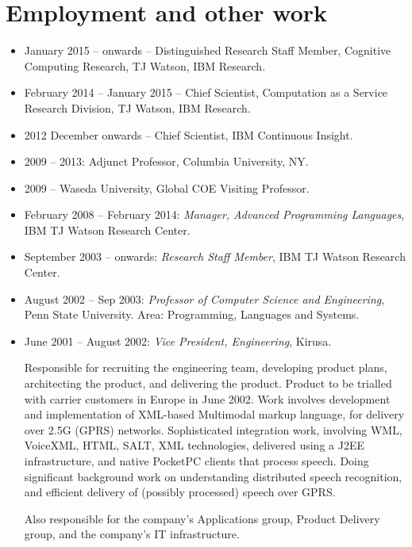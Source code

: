 \documentclass{article}
\begin{document}
\section*{Employment and other work}

\begin{itemize}
\item  January 2015 -- onwards -- Distinguished Research Staff Member,
  Cognitive Computing Research, TJ Watson, IBM Research.
\item  February 2014 -- January 2015 -- Chief Scientist, Computation
  as a Service Research Division, TJ Watson, IBM Research.

\item 2012 December onwards -- Chief Scientist, IBM Continuous Insight.

\item 2009 -- 2013: Adjunct Professor, Columbia University, NY.

\item 2009 -- Waseda University, Global COE Visiting Professor.

\item February 2008 -- February 2014: \textit{Manager, Advanced Programming Languages}, IBM TJ
Watson Research Center.

\item September 2003 -- onwards: \textit{Research Staff Member}, IBM TJ
Watson Research Center.

\item August 2002 -- Sep 2003: \textit{Professor of Computer Science and
Engineering}, Penn State University. Area: Programming, Languages and Systems.

\item June 2001 -- August 2002: \textit{Vice President, Engineering}, Kirusa.

  Responsible for recruiting the engineering team, developing product
  plans, architecting the product, and delivering the product.
  Product to be trialled with carrier customers in Europe in June
  2002. Work involves development and implementation of XML-based
  Multimodal markup language, for delivery over 2.5G (GPRS)
  networks. Sophisticated integration work, involving WML, VoiceXML,
  HTML, SALT, XML technologies, delivered using a J2EE infrastructure,
  and native PocketPC clients that process speech. Doing significant
  background work on understanding distributed speech recognition, and
  efficient delivery of (possibly processed) speech over GPRS.

  Also responsible for the company's Applications group, Product
  Delivery group, and the company's IT infrastructure. 


\end{itemize}
\end{document}
